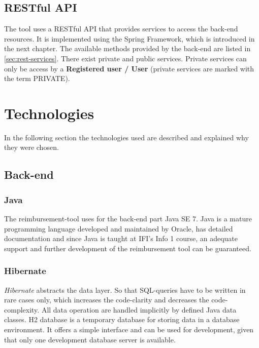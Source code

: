 \subsection{RESTful API}
\label{sec:restfulapi}
The tool uses a RESTful API that provides services to access the back-end resources. It is implemented using the Spring Framework, which is introduced in the next chapter. \newline 
The available methods provided by the back-end are listed in \ref{sec:rest-services}. There exist private and public services. Private services can only be access by a \textbf{Registered user / User} (private services are marked with the term PRIVATE).

\section{Technologies}

In the following section the technologies used are described and explained why they were chosen.

\subsection{Back-end}

\subsubsection{Java}
The reimbursement-tool uses for the back-end part Java SE 7. Java is a mature programming language developed and maintained by Oracle\cite{java}, has detailed documentation and since Java is taught at IFI's Info 1 course, an adequate support and further development of the reimbursement tool can be guaranteed.

\subsubsection{Hibernate}
\textit{Hibernate} abstracts the data layer. So that SQL-queries have to be written in rare cases only, which increases the code-clarity and decreases the code-complexity. All data operation are handled implicitly by defined Java data classes.\newline
H2 database is a temporary database for storing data in a database environment. It offers a simple interface and can be used for development, given that only one development database server is available. \cite{hibernate}

